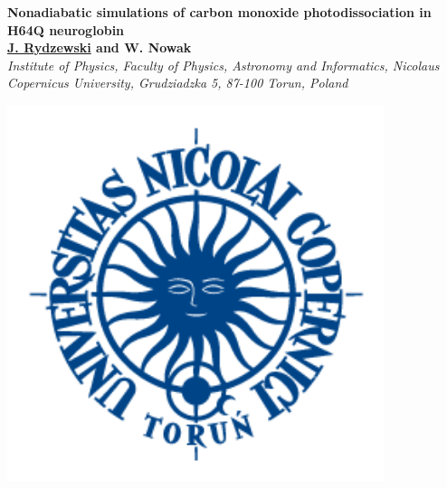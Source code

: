 \documentclass[a0,portrait]{a0poster}
\begin{document}
\begin{minipage}[b]{0.80\linewidth}
\veryHuge\centering\color{myblue} 
\textbf{Nonadiabatic simulations of carbon monoxide photodissociation in H64Q neuroglobin} 
\color{Black}\\[1cm]
\huge \textbf{\underline{J. Rydzewski} and W. Nowak}\\
\Large\textit{Institute of Physics, Faculty of Physics, Astronomy and Informatics, Nicolaus Copernicus University, Grudziadzka 5, 87-100 Torun, Poland}
\end{minipage}
%
\begin{minipage}[b]{0.20\linewidth}
\centering
\includegraphics[width=11cm]{umk.png}
\end{minipage}

\vspace{1cm}
\end{document}
